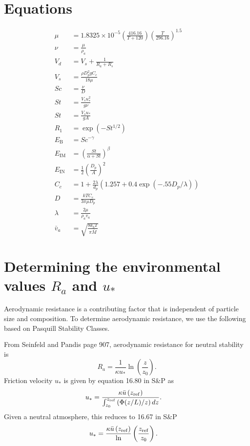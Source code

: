 \documentclass{article}
\begin{document}

\section{Equations}
\label{sec:equations}

\begin{align}
\mu & =  1.8325 \times 10^{-5}\left(\frac{416.16}{T + 120}\right)\left(\frac{T}{296.16}\right)^{1.5}\label{eq:dynamic_visc}\\
\nu & = \frac{\mu}{\rho_a}  \label{eq:kinematic_visc}\\
V_d &= V_s + \frac{1}{R_a + R_s} \label{eq:vd}\\
V_s & = \frac{\rho D_p^2gC_c}{18\mu } \label{eq:vs}\\
Sc &= \frac{\nu}{D}   \label{eq:sc} \\
St &= \frac{V_su_*^2}{g \nu } \label{eq:st_smooth}\\
St &= \frac{V_s u_*}{gA}  \label{eq:st_veg}\\
R_1 &= \exp(-St^{1/2}) \label{eq:R_1}\\
E_{\textrm{B}} &= Sc^{-\gamma}  \label{eq:eb}\\
E_{\textrm{IM}} & = \left(\frac{St}{\alpha + St}\right)^{\beta} \label{eq:eim}\\
E_{\textrm{IN}} &= \frac{1}{2} \left(\frac{D_p}{A}\right)^2 \label{eq:ein}\\
C_c & = 1 + \frac{2 \lambda}{d_p}\left(1.257 + 0.4\exp(-.55 D_p/\lambda)\right)  \label{eq:cc}\\ 
D & = \frac{kTC_c}{3 \pi \mu D_p}  \label{eq:brownian}\\
\lambda & = \frac{2 \mu}{\rho_a v_a} \label{eq:lambda}\\
\bar{v}_a & = \sqrt{\frac{8k_bT}{\pi\bar{M}}} \label{eq:thermal}
\end{align}

\section{Determining the environmental values $R_a$ and $u_*$}

Aerodynamic resistance is a contributing factor that is independent of particle size
and composition. To determine aerodynamic resistance, we use the following
based on Pasquill Stability Classes.

From Seinfeld and Pandis page 907, aerodynamic resistance for neutral stability is
\begin{equation}
R_a =
\frac{1}{\kappa u_*} \ln \left( \frac{z}{z_0} \right).
\end{equation}
Friction velocity $u_{*}$ is given by equation 16.80 in S\&P as
\begin{align}
u_* & = \frac{\kappa \bar{u}\left(z_{\rm ref}\right)}
  {\int_{z_0}^{z_{\rm ref}} \left(\Phi (z/L)/z\right)dz}.
\end{align}
Given a neutral atmosphere, this reduces to 16.67 in S\&P
\begin{align}
u_* & = \frac{\kappa \bar{u}\left(z_{\rm ref}\right)}
  \ln \left(\frac{z_{\rm ref}}{z_0}\right).
\end{align}
\end{document}
